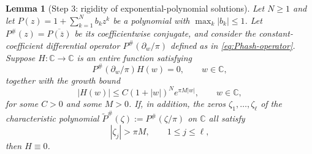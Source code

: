 \documentclass[a4paper,11pt,reqno]{amsart}
\numberwithin{equation}{section}
\theoremstyle{plain} %
\newtheorem{lemma}{Lemma}[section]
\theoremstyle{definition} %
\theoremstyle{remark}
\newcommand{\C}{\mathbb{C}}
\begin{document}
\begin{lemma}[Step 3: rigidity of exponential-polynomial solutions]\label{lem:step3-rigidity}
Let $N\ge1$ and let $P(z)=1+\sum_{k=1}^N b_k z^k$ be a polynomial with
$\max_k|b_k|\le 1$. Let \(P^\#(z)=\overline{P(\overline z)}\) be its
coefficientwise conjugate, and consider the constant-coefficient differential
operator \(P^\#(\partial_w/\pi)\) defined as in \eqref{eq:Phash-operator}.
Suppose $H\colon\C\to\C$ is an entire function satisfying
\begin{equation}\label{eq:lemma-step3-eq}
P^\#(\partial_w/\pi)H(w)=0,
\qquad w\in\C,
\end{equation}
together with the growth bound
\begin{equation}\label{eq:lemma-step3-growth}
|H(w)|\le C(1+|w|)^N e^{\pi M|w|},
\qquad w\in\C,
\end{equation}
for some \(C>0\) and some \(M>0\). If, in addition, the zeros
$\zeta_1,\dots,\zeta_\ell$ of the characteristic polynomial
$\widetilde P^\#(\zeta):=P^\#(\zeta/\pi)$ on $\C$ all satisfy
\begin{equation}\label{eq:lemma-step3-zeros}
|\zeta_j|>\pi M,\qquad 1\le j\le\ell,
\end{equation}
then \(H\equiv 0\).
\end{lemma}
\end{document}
